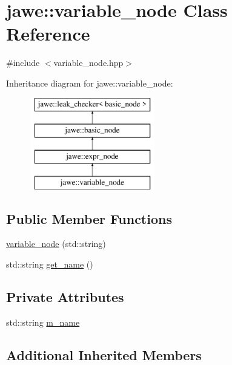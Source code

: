 \hypertarget{classjawe_1_1variable__node}{}\section{jawe\+:\+:variable\+\_\+node Class Reference}
\label{classjawe_1_1variable__node}


{\ttfamily \#include $<$variable\+\_\+node.\+hpp$>$}

Inheritance diagram for jawe\+:\+:variable\+\_\+node\+:\begin{figure}[H]
\begin{center}
\leavevmode
\includegraphics[height=4.000000cm]{classjawe_1_1variable__node}
\end{center}
\end{figure}
\subsection*{Public Member Functions}
\begin{DoxyCompactItemize}
\item 
\hyperlink{classjawe_1_1variable__node_a4dd9b103a9dfb03cf4eb6284cab550ec}{variable\+\_\+node} (std\+::string)
\item 
std\+::string \hyperlink{classjawe_1_1variable__node_a66b1ec8370c6823a184ef6e818186022}{get\+\_\+name} ()
\end{DoxyCompactItemize}
\subsection*{Private Attributes}
\begin{DoxyCompactItemize}
\item 
std\+::string \hyperlink{classjawe_1_1variable__node_a10d68d4ea7f00d21ab182a7a0b432a5f}{m\+\_\+name}
\end{DoxyCompactItemize}
\subsection*{Additional Inherited Members}


